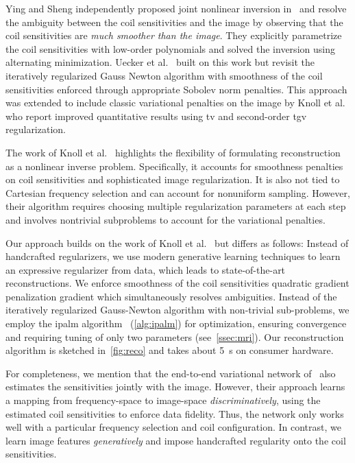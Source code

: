 Ying and Sheng independently proposed joint nonlinear inversion in~\cite{Ying2007} and resolve the ambiguity between the coil sensitivities and the image by observing that the coil sensitivities are \emph{much smoother than the image}.
They explicitly parametrize the coil sensitivities with low-order polynomials and solved the inversion using alternating minimization.
Uecker et al.~\cite{uecker_image_2008} built on this work but revisit the iteratively regularized Gauss Newton algorithm with smoothness of the coil sensitivities enforced through appropriate Sobolev norm penalties.
This approach was extended to include classic variational penalties on the image by Knoll et al.~\cite{Knoll2011} who report improved quantitative results using \gls{tv} and second-order \gls{tgv} regularization.

The work of Knoll et al.~\cite{Knoll2011} highlights the flexibility of formulating reconstruction as a nonlinear inverse problem.
Specifically, it accounts for smoothness penalties on coil sensitivities and sophisticated image regularization.
It is also not tied to Cartesian frequency selection and can account for nonuniform sampling.
However, their algorithm requires choosing multiple regularization parameters at each step and involves nontrivial subproblems to account for the variational penalties.

Our approach builds on the work of Knoll et al.~\cite{Knoll2011} but differs as follows:
Instead of handcrafted regularizers, we use modern generative learning techniques to learn an expressive regularizer from data, which leads to state-of-the-art reconstructions.
We enforce smoothness of the coil sensitivities quadratic gradient penalization gradient which simultaneously resolves ambiguities.
Instead of the iteratively regularized Gauss-Newton algorithm with non-trivial sub-problems, we employ the \gls{ipalm} algorithm~\cite{pock_inertial_2016} (\cref{alg:ipalm}) for optimization, ensuring convergence and requiring tuning of only two parameters (see~\cref{ssec:mri}).
Our reconstruction algorithm is sketched in~\cref{fig:reco} and takes about \qty{5}{\second} on consumer hardware.

For completeness, we mention that the end-to-end variational network of~\cite{sriram_endtoend_2020} also estimates the sensitivities jointly with the image.
However, their approach learns a mapping from frequency-space to image-space \emph{discriminatively}, using the estimated coil sensitivities to enforce data fidelity.
Thus, the network only works well with a particular frequency selection and coil configuration.
In contrast, we learn image features \emph{generatively} and impose handcrafted regularity onto the coil sensitivities.
